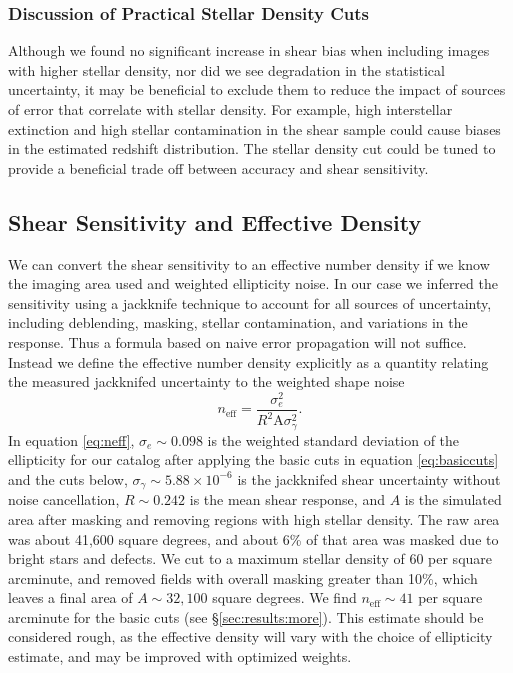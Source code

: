 \documentclass[twocolumn,twocolappendix,astrosym]{openjournal}
\begin{document}
\subsubsection{Discussion of Practical Stellar Density Cuts}

Although we found no significant increase in shear bias when including images
with higher stellar density, nor did we see degradation in the statistical
uncertainty, it may be beneficial to exclude them to reduce the impact of
sources of error that correlate with stellar density.  For example, high
interstellar extinction and high stellar contamination in the shear sample
could cause biases in the estimated redshift distribution.  The stellar density
cut could be tuned to provide a beneficial trade off between accuracy and shear
sensitivity.

\subsection{Shear Sensitivity and Effective Density} \label{sec:results:effdens}


We can convert the shear sensitivity to an effective number density if we know
the imaging area used and weighted ellipticity noise.  In our case we inferred the
sensitivity using a jackknife technique to account for all sources of
uncertainty, including deblending, masking, stellar contamination, and
variations in the response.  Thus a formula based on naive error propagation
will not suffice.  Instead we define the effective number density explicitly as
a quantity relating the measured jackknifed uncertainty to the weighted shape
noise
\begin{equation} \label{eq:neff}
    n_{\mathrm{eff}} = \frac{\sigma^2_{e}}{R^2 \mathrm{A} \sigma^2_{\gamma}}.
\end{equation}
In equation \ref{eq:neff}, $\sigma_e \sim 0.098$ is the weighted standard
deviation of the ellipticity for our catalog after applying the basic cuts in
equation \ref{eq:basiccuts} and the cuts below, $\sigma_\gamma \sim 5.88 \times
10^{-6}$ is the jackknifed shear uncertainty without noise cancellation, $R
\sim 0.242$ is the mean shear response, and $A$ is the simulated area after
masking and removing regions with high stellar density.    The raw area was about 41,600
square degrees, and about 6\% of that area was masked due to bright stars and
defects.  We cut to a maximum stellar density of 60 per square arcminute, and
removed fields with overall masking greater than 10\%, which leaves a final
area of $A \sim 32,100$ square degrees.  We find $n_\mathrm{eff} \sim 41$ per
square arcminute for the basic cuts (see \S \ref{sec:results:more}).  This
estimate should be considered rough, as the effective density will vary with
the choice of ellipticity estimate, and may be improved with optimized weights.
\end{document}
